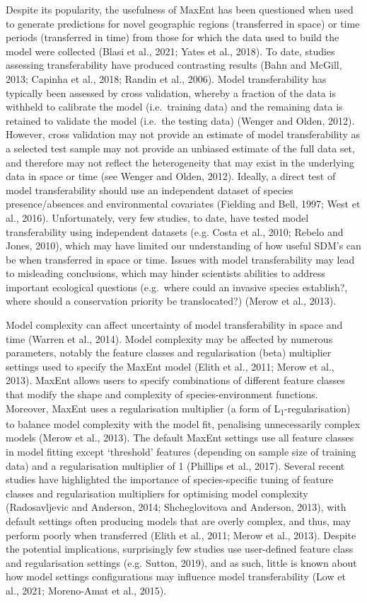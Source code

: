 \documentclass[12pt,]{article}
\begin{document}
Despite its popularity, the usefulness of MaxEnt has been questioned
when used to generate predictions for novel geographic regions
(transferred in space) or time periods (transferred in time) from those
for which the data used to build the model were collected (Blasi et al.,
2021; Yates et al., 2018). To date, studies assessing transferability
have produced contrasting results (Bahn and McGill, 2013; Capinha et
al., 2018; Randin et al., 2006). Model transferability has typically
been assessed by cross validation, whereby a fraction of the data is
withheld to calibrate the model (i.e.~training data) and the remaining
data is retained to validate the model (i.e.~the testing data) (Wenger
and Olden, 2012). However, cross validation may not provide an estimate
of model transferability as a selected test sample may not provide an
unbiased estimate of the full data set, and therefore may not reflect
the heterogeneity that may exist in the underlying data in space or time
(see Wenger and Olden, 2012). Ideally, a direct test of model
transferability should use an independent dataset of species
presence/absences and environmental covariates (Fielding and Bell, 1997;
West et al., 2016). Unfortunately, very few studies, to date, have
tested model transferability using independent datasets (e.g. Costa et
al., 2010; Rebelo and Jones, 2010), which may have limited our
understanding of how useful SDM's can be when transferred in space or
time. Issues with model transferability may lead to misleading
conclusions, which may hinder scientists abilities to address important
ecological questions (e.g.~where could an invasive species establish?,
where should a conservation priority be translocated?) (Merow et al.,
2013).

Model complexity can affect uncertainty of model transferability in
space and time (Warren et al., 2014). Model complexity may be affected
by numerous parameters, notably the feature classes and regularisation
(beta) multiplier settings used to specify the MaxEnt model (Elith et
al., 2011; Merow et al., 2013). MaxEnt allows users to specify
combinations of different feature classes that modify the shape and
complexity of species-environment functions. Moreover, MaxEnt uses a
regularisation multiplier (a form of L\textsubscript{1}-regularisation)
to balance model complexity with the model fit, penalising unnecessarily
complex models (Merow et al., 2013). The default MaxEnt settings use all
feature classes in model fitting except `threshold' features (depending
on sample size of training data) and a regularisation multiplier of 1
(Phillips et al., 2017). Several recent studies have highlighted the
importance of species-specific tuning of feature classes and
regularisation multipliers for optimising model complexity
(Radosavljevic and Anderson, 2014; Shcheglovitova and Anderson, 2013),
with default settings often producing models that are overly complex,
and thus, may perform poorly when transferred (Elith et al., 2011; Merow
et al., 2013). Despite the potential implications, surprisingly few
studies use user-defined feature class and regularisation settings (e.g.
Sutton, 2019), and as such, little is known about how model settings
configurations may influence model transferability (Low et al., 2021;
Moreno-Amat et al., 2015).
\end{document}
